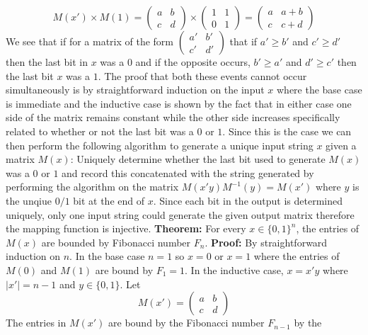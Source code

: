 \documentclass[12pt]{article}
\begin{document}
$$M(x') \times M(1) =
\left(\begin{array}{cc} a & b \\ c & d \end{array}\right) \times
\left(\begin{array}{cc} 1 & 1 \\ 0 & 1 \end{array}\right) =
\left(\begin{array}{cc} a & a+b \\ c & c+d \end{array}\right)$$
We see that if for a matrix of the form 
$\left(\begin{array}{cc} a' & b' \\ c' & d' \end{array}\right)$ that if
$a' \ge b'$ and $c' \ge d'$ then the last bit in $x$ was a $0$ and if
the opposite occurs, $b' \ge a'$ and $d' \ge c'$ then the last bit $x$ was
a $1$. The proof that both these events cannot occur simultaneously is by
straightforward induction on the input $x$ where the base case is immediate and
the inductive case is shown by the fact that in either case one side of the
matrix remains constant while the other side increases specifically related
to whether or not the last bit was a $0$ or $1$. Since this is the case we can
then perform the following algorithm to generate a unique input string $x$ given
a matrix $M(x)$: Uniquely determine whether the last bit used to generate $M(x)$
was a $0$ or $1$ and record this concatenated with the string generated by
performing the algorithm on the matrix $M(x'y)M^{-1}(y) = M(x')$ where $y$ is
the unqiue $0/1$ bit at the end of $x$. Since each bit in the output is determined
uniquely, only one input string could generate the given output matrix therefore
the mapping function is injective.
\vspace{2mm}
\newline
\textbf{Theorem:} For every $x \in \{0,1\}^n$, the entries of $M(x)$ are bounded
by Fibonacci number $F_n$.
\newline
\textbf{Proof:} By straightforward induction on $n$. In the base case $n = 1$ so
$x = 0$ or $x = 1$ where the entries of $M(0)$ and $M(1)$ are bound by $F_1 = 1$.
In the inductive case, $x = x'y$ where $|x'| = n-1$ and $y \in \{0,1\}$. Let
$$M(x') = \left(\begin{array}{cc} a & b \\ c & d \end{array}\right)$$
The entries in $M(x')$ are bound by the Fibonacci number $F_{n-1}$ by the
\end{document}
